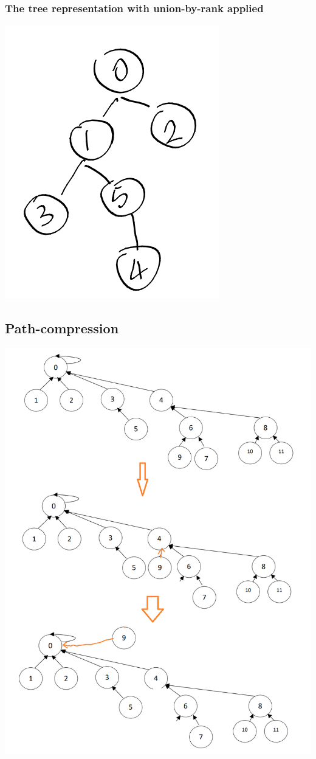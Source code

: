 \documentclass[12pt]{article}
\begin{document}
\subsubsection{The tree representation with union-by-rank applied}
\includegraphics[list representation]{pics/as3prob5.3.png}

\subsection{Path-compression}
\includegraphics[path compression]{pics/as3prob5.4.png}
\end{document}
